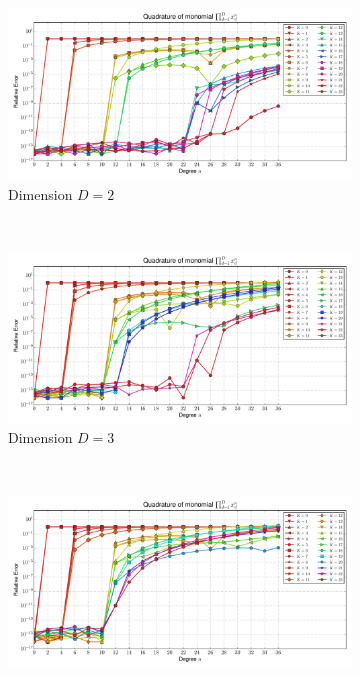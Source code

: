 \documentclass[a4paper,10pt]{article}
\begin{document}
\begin{figure}
  \begin{subfigure}[b]{\linewidth}
    \centering
    \includegraphics[width=\linewidth]{./img/monomial_errors_legendre_multivariate_dimension_2.pdf}
    \caption{Dimension $D=2$}
    \label{fig:monomial_errors_legendre_multivariate_dimension_2}
  \end{subfigure} \\
  \begin{subfigure}[b]{\linewidth}
    \centering
    \includegraphics[width=\linewidth]{./img/monomial_errors_legendre_multivariate_dimension_3.pdf}
    \caption{Dimension $D=3$}
    \label{fig:monomial_errors_legendre_multivariate_dimension_3}
  \end{subfigure} \\
  \begin{subfigure}[b]{\linewidth}
    \centering
    \includegraphics[width=\linewidth]{./img/monomial_errors_legendre_multivariate_dimension_4.pdf}

\end{subfigure}
\end{figure}
\end{document}
